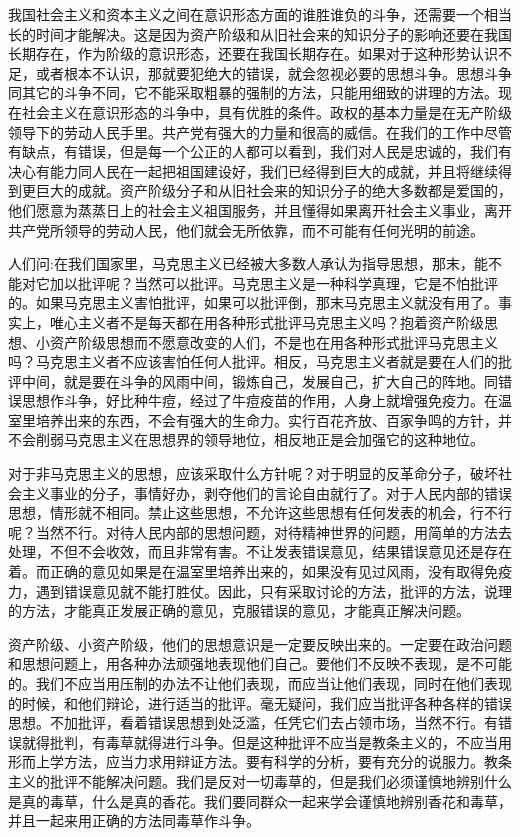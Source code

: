我国社会主义和资本主义之间在意识形态方面的谁胜谁负的斗争，还需要一个相当长的时间才能解决。这是因为资产阶级和从旧社会来的知识分子的影响还要在我国长期存在，作为阶级的意识形态，还要在我国长期存在。如果对于这种形势认识不足，或者根本不认识，那就要犯绝大的错误，就会忽视必要的思想斗争。思想斗争同其它的斗争不同，它不能采取粗暴的强制的方法，只能用细致的讲理的方法。现在社会主义在意识形态的斗争中，具有优胜的条件。政权的基本力量是在无产阶级领导下的劳动人民手里。共产党有强大的力量和很高的威信。在我们的工作中尽管有缺点，有错误，但是每一个公正的人都可以看到，我们对人民是忠诚的，我们有决心有能力同人民在一起把祖国建设好，我们已经得到巨大的成就，并且将继续得到更巨大的成就。资产阶级分子和从旧社会来的知识分子的绝大多数都是爱国的，他们愿意为蒸蒸日上的社会主义祖国服务，并且懂得如果离开社会主义事业，离开共产党所领导的劳动人民，他们就会无所依靠，而不可能有任何光明的前途。

人们问:在我们国家里，马克思主义已经被大多数人承认为指导思想，那末，能不能对它加以批评呢？当然可以批评。马克思主义是一种科学真理，它是不怕批评的。如果马克思主义害怕批评，如果可以批评倒，那末马克思主义就没有用了。事实上，唯心主义者不是每天都在用各种形式批评马克思主义吗？抱着资产阶级思想、小资产阶级思想而不愿意改变的人们，不是也在用各种形式批评马克思主义吗？马克思主义者不应该害怕任何人批评。相反，马克思主义者就是要在人们的批评中间，就是要在斗争的风雨中间，锻炼自己，发展自己，扩大自己的阵地。同错误思想作斗争，好比种牛痘，经过了牛痘疫苗的作用，人身上就增强免疫力。在温室里培养出来的东西，不会有强大的生命力。实行百花齐放、百家争鸣的方针，并不会削弱马克思主义在思想界的领导地位，相反地正是会加强它的这种地位。

对于非马克思主义的思想，应该采取什么方针呢？对于明显的反革命分子，破坏社会主义事业的分子，事情好办，剥夺他们的言论自由就行了。对于人民内部的错误思想，情形就不相同。禁止这些思想，不允许这些思想有任何发表的机会，行不行呢？当然不行。对待人民内部的思想问题，对待精神世界的问题，用简单的方法去处理，不但不会收效，而且非常有害。不让发表错误意见，结果错误意见还是存在着。而正确的意见如果是在温室里培养出来的，如果没有见过风雨，没有取得免疫力，遇到错误意见就不能打胜仗。因此，只有采取讨论的方法，批评的方法，说理的方法，才能真正发展正确的意见，克服错误的意见，才能真正解决问题。

资产阶级、小资产阶级，他们的思想意识是一定要反映出来的。一定要在政治问题和思想问题上，用各种办法顽强地表现他们自己。要他们不反映不表现，是不可能的。我们不应当用压制的办法不让他们表现，而应当让他们表现，同时在他们表现的时候，和他们辩论，进行适当的批评。毫无疑问，我们应当批评各种各样的错误思想。不加批评，看着错误思想到处泛滥，任凭它们去占领市场，当然不行。有错误就得批判，有毒草就得进行斗争。但是这种批评不应当是教条主义的，不应当用形而上学方法，应当力求用辩证方法。要有科学的分析，要有充分的说服力。教条主义的批评不能解决问题。我们是反对一切毒草的，但是我们必须谨慎地辨别什么是真的毒草，什么是真的香花。我们要同群众一起来学会谨慎地辨别香花和毒草，并且一起来用正确的方法同毒草作斗争。

